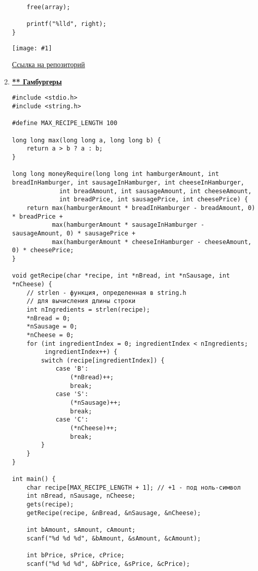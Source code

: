 \documentclass[a4paper,14pt]{extarticle}
\newcommand\codeforcesresult[1]{
    \begin{center}
        \texttt{[image: \#1]}
    \end{center}
}
\begin{document}
\begin{enumerate}
\begin{verbatim}
    free(array);

    printf("%lld", right);
}
\end{verbatim}
\codeforcesresult{/codeforceresults/285083B}
\href{https://github.com/IAmProgrammist/programming-and-algorithmization-basics/blob/c/lab10/16.c}{\underline{Ссылка на репозиторий}}

\newpage
\item \href{https://codeforces.com/edu/course/2/lesson/6/2/practice/contest/283932/problem/H}{\textbf{** Гамбургеры}}
\begin{verbatim}
#include <stdio.h>
#include <string.h>

#define MAX_RECIPE_LENGTH 100

long long max(long long a, long long b) {
    return a > b ? a : b;
}

long long moneyRequire(long long int hamburgerAmount, int breadInHamburger, int sausageInHamburger, int cheeseInHamburger,
             int breadAmount, int sausageAmount, int cheeseAmount,
             int breadPrice, int sausagePrice, int cheesePrice) {
    return max(hamburgerAmount * breadInHamburger - breadAmount, 0) * breadPrice +
           max(hamburgerAmount * sausageInHamburger - sausageAmount, 0) * sausagePrice +
           max(hamburgerAmount * cheeseInHamburger - cheeseAmount, 0) * cheesePrice;
}

void getRecipe(char *recipe, int *nBread, int *nSausage, int *nCheese) {
    // strlen - функция, определенная в string.h
    // для вычисления длины строки
    int nIngredients = strlen(recipe);
    *nBread = 0;
    *nSausage = 0;
    *nCheese = 0;
    for (int ingredientIndex = 0; ingredientIndex < nIngredients;
         ingredientIndex++) {
        switch (recipe[ingredientIndex]) {
            case 'B':
                (*nBread)++;
                break;
            case 'S':
                (*nSausage)++;
                break;
            case 'C':
                (*nCheese)++;
                break;
        }
    }
}

int main() {
    char recipe[MAX_RECIPE_LENGTH + 1]; // +1 - под ноль-символ
    int nBread, nSausage, nCheese;
    gets(recipe);
    getRecipe(recipe, &nBread, &nSausage, &nCheese);

    int bAmount, sAmount, cAmount;
    scanf("%d %d %d", &bAmount, &sAmount, &cAmount);

    int bPrice, sPrice, cPrice;
    scanf("%d %d %d", &bPrice, &sPrice, &cPrice);


\end{verbatim}
\end{enumerate}
\end{document}
